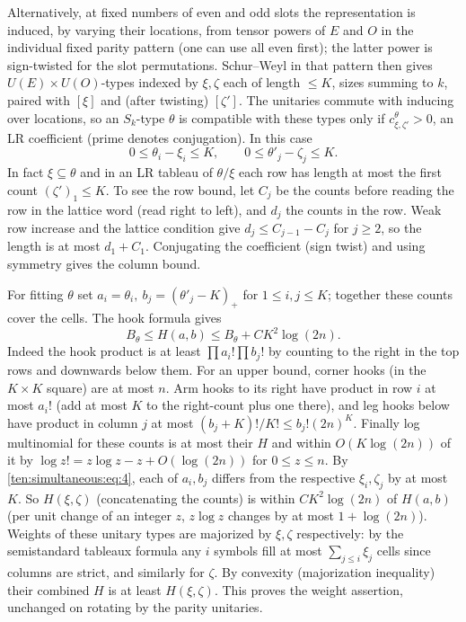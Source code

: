 Alternatively, at fixed numbers of even and odd slots the representation is induced, by varying their locations, from tensor powers of \(E\) and \(O\) in the individual fixed parity pattern (one can use all even first); the latter power is sign-twisted for the slot permutations. Schur--Weyl in that pattern then gives \(U(E)\times U(O)\)-types indexed by \(\xi,\zeta\) each of length \(\le K\), sizes summing to \(k\), paired with \([\xi]\) and (after twisting) \([\zeta']\). The unitaries commute with inducing over locations, so an \(S_k\)-type \(\theta\) is compatible with these types only if \(c_{\xi,\zeta'}^\theta>0\), an LR coefficient (prime denotes conjugation). In this case
\begin{equation}
 0\le \theta_i-\xi_i\le K,\qquad
 0\le \theta'_j-\zeta_j\le K.                                         \label{ten:simultaneous:eq:4}
\end{equation}
In fact \(\xi\subseteq\theta\) and in an LR tableau of \(\theta/\xi\) each row has length at most the first count \((\zeta')_1\le K\). To see the row bound, let \(C_j\) be the counts before reading the row in the lattice word (read right to left), and \(d_j\) the counts in the row. Weak row increase and the lattice condition give \(d_j\le C_{j-1}-C_j\) for \(j\ge2\), so the length is at most \(d_1+C_1\). Conjugating the coefficient (sign twist) and using symmetry gives the column bound.

For fitting \(\theta\) set \(a_i=\theta_i,\ b_j=(\theta'_j-K)_+\) for \(1\le i,j\le K\); together these counts cover the cells. The hook formula gives
\[
 B_\theta\le H(a,b)\le B_\theta+C K^2\log(2n).
\]
Indeed the hook product is at least \(\prod a_i!\prod b_j!\) by counting to the right in the top rows and downwards below them. For an upper bound, corner hooks (in the \(K\times K\) square) are at most \(n\). Arm hooks to its right have product in row \(i\) at most \(a_i!\) (add at most \(K\) to the right-count plus one there), and leg hooks below have product in column \(j\) at most \((b_j+K)!/K!\le b_j!(2n)^K\). Finally log multinomial for these counts is at most their \(H\) and within \(O(K\log(2n))\) of it by \(\log z!=z\log z-z+O(\log(2n))\) for \(0\le z\le n\). By \eqref{ten:simultaneous:eq:4}, each of \(a_i,b_j\) differs from the respective \(\xi_i,\zeta_j\) by at most \(K\). So \(H(\xi,\zeta)\) (concatenating the counts) is within \(C K^2\log(2n)\) of \(H(a,b)\) (per unit change of an integer \(z\), \(z\log z\) changes by at most \(1+\log(2n)\)). Weights of these unitary types are majorized by \(\xi,\zeta\) respectively: by the semistandard tableaux formula any \(i\) symbols fill at most \(\sum_{j\le i}\xi_j\) cells since columns are strict, and similarly for \(\zeta\). By convexity (majorization inequality) their combined \(H\) is at least \(H(\xi,\zeta)\). This proves the weight assertion, unchanged on rotating by the parity unitaries.

